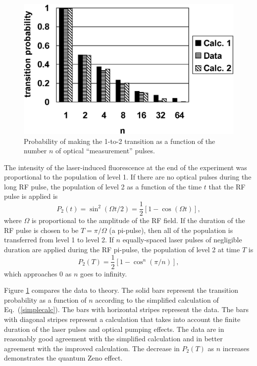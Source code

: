 \documentclass[letterpaper]{jpconf}
\begin{document}
\begin{figure}[htb]
\begin{center}
\includegraphics[width=5in]{data_12a.eps}
\end{center}
\caption{\label{datafig}Probability of making the 1-to-2 transition
as a function of the number $n$ of optical ``measurement'' pulses.}
\end{figure}

The intensity of the laser-induced fluorescence at the end of the
experiment was proportional to the population of level 1. If there
are no optical pulses during the long RF pulse, the population of
level 2 as a function of the time $t$ that the RF pulse is applied
is
\begin{equation}
P_2(t)=\sin^2(\Omega t/2) = \frac{1}{2}[1-\cos(\Omega
t)],\label{rabiflop}
\end{equation}
where $\Omega$ is proportional to the amplitude of the RF field. If
the duration of the RF pulse is chosen to be $T=\pi/\Omega$ (a
pi-pulse), then all of the population is transferred from level 1 to
level 2. If $n$ equally-spaced laser pulses of negligible duration
are applied during the RF pi-pulse, the population of level 2 at
time $T$ is
\begin{equation}
P_2(T)=\frac{1}{2}\left[1-\cos^n(\pi/n)\right],\label{simplecalc}
\end{equation}
which approaches 0 as $n$ goes to infinity.

Figure \ref{datafig} compares the data to theory. The solid bars
represent the transition probability as a function of $n$ according
to the simplified calculation of Eq.~(\ref{simplecalc}). The bars
with horizontal stripes represent the data.  The bars with diagonal
stripes represent a calculation that takes into account the finite
duration of the laser pulses and optical pumping effects. The data
are in reasonably good agreement with the simplified calculation and
in better agreement with the improved calculation. The decrease in
$P_2(T)$ as $n$ increases demonstrates the quantum Zeno effect.
\end{document}

